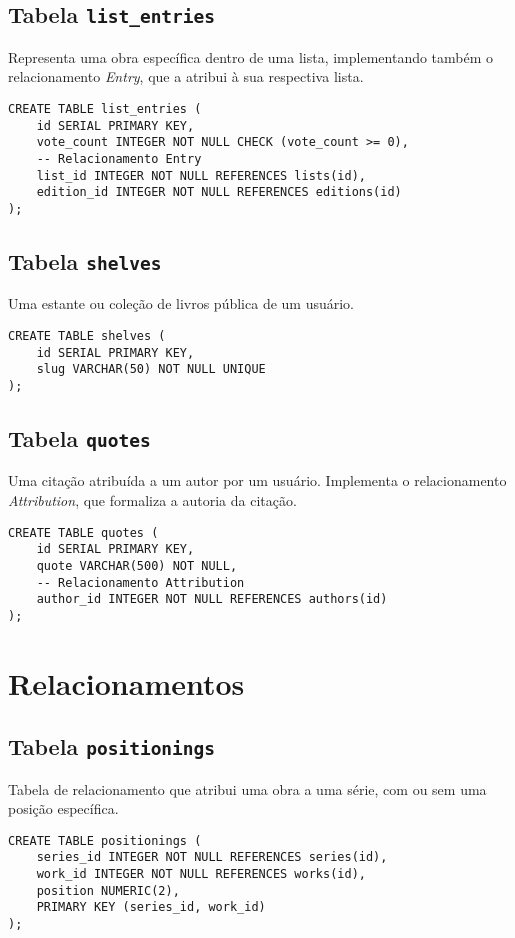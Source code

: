 \documentclass[12pt]{article}
\begin{document}
\newpage

\subsection{Tabela \texttt{list\_entries}}
Representa uma obra específica dentro de uma lista, implementando também o relacionamento \textit{Entry}, que a atribui à sua respectiva lista.
\begin{lstlisting}
CREATE TABLE list_entries (
    id SERIAL PRIMARY KEY,
    vote_count INTEGER NOT NULL CHECK (vote_count >= 0),
    -- Relacionamento Entry
    list_id INTEGER NOT NULL REFERENCES lists(id),
    edition_id INTEGER NOT NULL REFERENCES editions(id)
);
\end{lstlisting}

\subsection{Tabela \texttt{shelves}}
Uma estante ou coleção de livros pública de um usuário.
\begin{lstlisting}
CREATE TABLE shelves (
    id SERIAL PRIMARY KEY,
    slug VARCHAR(50) NOT NULL UNIQUE
);
\end{lstlisting}

\subsection{Tabela \texttt{quotes}}
Uma citação atribuída a um autor por um usuário. Implementa o relacionamento \textit{Attribution}, que formaliza a autoria da citação.
\begin{lstlisting}
CREATE TABLE quotes (
    id SERIAL PRIMARY KEY,
    quote VARCHAR(500) NOT NULL,
    -- Relacionamento Attribution
    author_id INTEGER NOT NULL REFERENCES authors(id)
);
\end{lstlisting}

\clearpage
\section{Relacionamentos}

\subsection{Tabela \texttt{positionings}}
Tabela de relacionamento que atribui uma obra a uma série, com ou sem uma posição específica.
\begin{lstlisting}
CREATE TABLE positionings (
    series_id INTEGER NOT NULL REFERENCES series(id),
    work_id INTEGER NOT NULL REFERENCES works(id),
    position NUMERIC(2),
    PRIMARY KEY (series_id, work_id)
);
\end{lstlisting}
\end{document}
